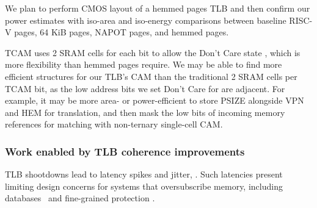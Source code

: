 We plan to perform CMOS layout of a hemmed pages TLB and then confirm our power estimates with iso-area and iso-energy comparisons between baseline RISC-V pages, 64 KiB pages, NAPOT pages, and hemmed pages.

TCAM uses 2 SRAM cells for each bit to allow the Don't Care state \cite{pagiamtzis_content-addressable_2006}, which is more flexibility than hemmed pages require. We may be able to find more efficient structures for our TLB's CAM \cite{hanzawa_dynamic_2004, hanzawa_large-scale_2005} than the traditional 2 SRAM cells per TCAM bit, as the low address bits we set Don't Care for are adjacent. For example, it may be more area- or power-efficient to store PSIZE alongside VPN and HEM for translation, and then mask the low bits of incoming memory references for matching with non-ternary single-cell CAM.


\subsubsection{Work enabled by TLB coherence improvements}

TLB shootdowns lead to latency spikes and jitter, \cite{rigtorp_latency_2020, gallenmuller_ducked_2021, gallenmuller_how_2022}. Such latencies present limiting design concerns for systems that oversubscribe memory, including databases~\cite{crotty_are_2022} and fine-grained protection \cite{porter_decker_2023}.

\endinput